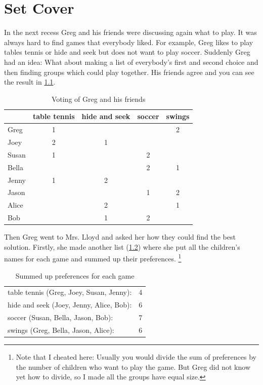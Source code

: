 \chapter{Set Cover}
In the next recess Greg and his friends were discussing again what
to play. It was always hard to find games that everybody liked.
For example, Greg likes to play tables tennis or hide and seek but
does not want to play soccer. Suddenly Greg had an idea: What about
making a list of everybody's first and second choice and then 
finding groups which could play together. His friends agree and
you can see the result in \cref{tab:game_voting}.

\begin{table}[ht]
  \centering
  \begin{tabular}{l|cccc}
    & table tennis & hide and seek & soccer & swings \\
    \hline
    Greg  & 1 &   &   & 2 \\
    Joey  & 2 & 1 &   &   \\
    Susan & 1 &   & 2 &   \\
    Bella &   &   & 2 & 1 \\
    Jenny & 1 & 2 &   &   \\
    Jason &   &   & 1 & 2 \\
    Alice &   & 2 &   & 1 \\
    Bob   &   & 1 & 2 &   \\
  \end{tabular}
  \caption{\label{tab:game_voting}Voting of Greg and his friends}
\end{table}

Then Greg went to Mrs. Lloyd and asked her how they could find the 
best solution. Firstly, she made another list
(\cref{tab:example_set_cover}) where she put all the children's
names for each game and summed up their preferences.%
\footnote{Note that I cheated here: Usually you would divide the
sum of preferences by the number of children who want to play the
game. But Greg did not know yet how to divide, so I made all the
groups have equal size.}

\begin{table}[ht]
  \centering
  \begin{tabular}{lc}
    table tennis (Greg, Joey, Susan, Jenny): & 4 \\
    hide and seek (Joey, Jenny, Alice, Bob): & 6 \\
    soccer (Susan, Bella, Jason, Bob):       & 7 \\
    swings (Greg, Bella, Jason, Alice):      & 6 \\
  \end{tabular}
  \caption{\label{tab:example_set_cover}Summed up preferences for each game}
\end{table}

